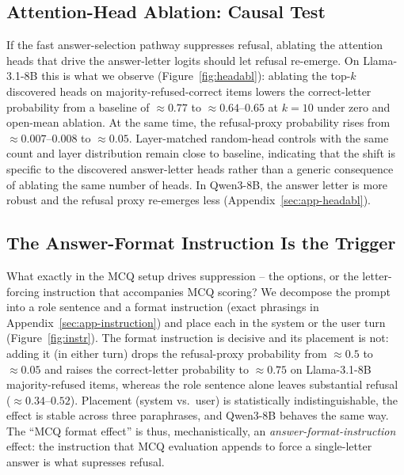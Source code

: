 \documentclass[11pt]{article}
\begin{document}
\subsection{Attention-Head Ablation: Causal Test}
If the fast answer-selection pathway suppresses refusal, ablating the attention heads that drive the answer-letter logits should let refusal re-emerge. On Llama-3.1-8B this is what we observe (Figure~\ref{fig:headabl}): ablating the top-$k$ discovered heads on  majority-refused-correct items lowers the correct-letter probability from a baseline of $\approx 0.77$ to $\approx 0.64$--$0.65$ at $k{=}10$ under zero and open-mean ablation. At the same time, the refusal-proxy probability rises from $\approx 0.007$--$0.008$ to $\approx 0.05$. Layer-matched random-head controls with the same count and layer distribution remain close to baseline, indicating that the shift is specific to the discovered answer-letter heads rather than a generic consequence of ablating the same number of heads. In Qwen3-8B, the answer letter is more robust and the refusal proxy re-emerges less (Appendix~\ref{sec:app-headabl}).



\subsection{The Answer-Format Instruction Is the Trigger}
\label{sec:res-instruction}
What exactly in the MCQ setup drives suppression -- the options, or the letter-forcing instruction that accompanies MCQ scoring? We decompose the prompt into a role sentence and a format instruction (exact phrasings in Appendix~\ref{sec:app-instruction}) and place each in the system or the user turn (Figure~\ref{fig:instr}). The format instruction is decisive and its placement is not: adding it (in either turn) drops the refusal-proxy probability from $\approx 0.5$ to $\approx 0.05$ and raises the correct-letter probability to $\approx 0.75$ on Llama-3.1-8B majority-refused items, whereas the role sentence alone leaves substantial refusal ($\approx 0.34$--$0.52$). Placement (system vs.\ user) is statistically indistinguishable, the effect is stable across three paraphrases, and Qwen3-8B behaves the same way. The ``MCQ format effect'' is thus, mechanistically, an \emph{answer-format-instruction} effect: the instruction that MCQ evaluation appends to force a single-letter answer is what supresses refusal.
\end{document}
